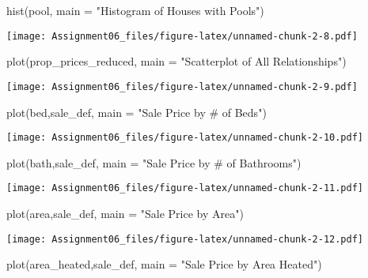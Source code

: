 \documentclass[
]{article}
\newenvironment{Shaded}{\begin{snugshade}}{\end{snugshade}}
\newcommand{\AttributeTok}[1]{\textcolor[rgb]{0.77,0.63,0.00}{#1}}
\newcommand{\FunctionTok}[1]{\textcolor[rgb]{0.00,0.00,0.00}{#1}}
\newcommand{\NormalTok}[1]{#1}
\newcommand{\StringTok}[1]{\textcolor[rgb]{0.31,0.60,0.02}{#1}}
\begin{document}
\begin{Shaded}
\begin{Highlighting}[]
\FunctionTok{hist}\NormalTok{(pool, }\AttributeTok{main =} \StringTok{"Histogram of Houses with Pools"}\NormalTok{)}
\end{Highlighting}
\end{Shaded}

\texttt{[image: Assignment06\_files/figure-latex/unnamed-chunk-2-8.pdf]}

\begin{Shaded}
\begin{Highlighting}[]
\FunctionTok{plot}\NormalTok{(prop\_prices\_reduced, }\AttributeTok{main =} \StringTok{"Scatterplot of All Relationships"}\NormalTok{)}
\end{Highlighting}
\end{Shaded}

\texttt{[image: Assignment06\_files/figure-latex/unnamed-chunk-2-9.pdf]}

\begin{Shaded}
\begin{Highlighting}[]
\FunctionTok{plot}\NormalTok{(bed,sale\_def, }\AttributeTok{main =} \StringTok{"Sale Price by \# of Beds"}\NormalTok{)}
\end{Highlighting}
\end{Shaded}

\texttt{[image: Assignment06\_files/figure-latex/unnamed-chunk-2-10.pdf]}

\begin{Shaded}
\begin{Highlighting}[]
\FunctionTok{plot}\NormalTok{(bath,sale\_def, }\AttributeTok{main =} \StringTok{"Sale Price by \# of Bathrooms"}\NormalTok{)}
\end{Highlighting}
\end{Shaded}

\texttt{[image: Assignment06\_files/figure-latex/unnamed-chunk-2-11.pdf]}

\begin{Shaded}
\begin{Highlighting}[]
\FunctionTok{plot}\NormalTok{(area,sale\_def, }\AttributeTok{main =} \StringTok{"Sale Price by Area"}\NormalTok{)}
\end{Highlighting}
\end{Shaded}

\texttt{[image: Assignment06\_files/figure-latex/unnamed-chunk-2-12.pdf]}

\begin{Shaded}
\begin{Highlighting}[]
\FunctionTok{plot}\NormalTok{(area\_heated,sale\_def, }\AttributeTok{main =} \StringTok{"Sale Price by Area Heated"}\NormalTok{)}
\end{Highlighting}
\end{Shaded}
\end{document}
